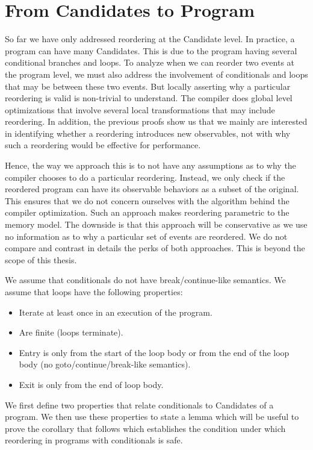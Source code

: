 \section{From Candidates to Program}

    So far we have only addressed reordering at the Candidate level. 
    In practice, a program can have many Candidates. 
    This is due to the program having several conditional branches and loops. 
    To analyze when we can reorder two events at the program level, we must also address the involvement of conditionals and loops that may be between these two events.
    But locally asserting why a particular reordering is valid is non-trivial to understand. 
    The compiler does global level optimizations that involve several local transformations that may include reordering. 
    In addition, the previous proofs show us that we mainly are interested in identifying whether a reordering introduces new observables, not with why such a reordering would be effective for performance.

    Hence, the way we approach this is to not have any assumptions as to why the compiler chooses to do a particular reordering. 
    Instead, we only check if the reordered program can have its observable behaviors as a subset of the original. 
    This ensures that we do not concern ourselves with the algorithm behind the compiler optimization. 
    Such an approach makes reordering parametric to the memory model. 
    The downside is that this approach will be conservative as we use no information as to why a particular set of events are reordered. 
    We do not compare and contrast in details the perks of both approaches. 
    This is beyond the scope of this thesis.

    We assume that conditionals do not have break/continue-like semantics. 
    We assume that loops have the following properties:
    \begin{itemize}
        \item Iterate at least once in an execution of the program.
        \item Are finite (loops terminate).
        \item Entry is only from the start of the loop body or from the end of the loop body (no goto/continue/break-like semantics).
        \item Exit is only from the end of loop body. 
    \end{itemize}

    We first define two properties that relate conditionals to Candidates of a program.
    We then use these properties to state a lemma which will be useful to prove the corollary that follows which establishes the condition under which reordering in programs with conditionals is safe. 
    

